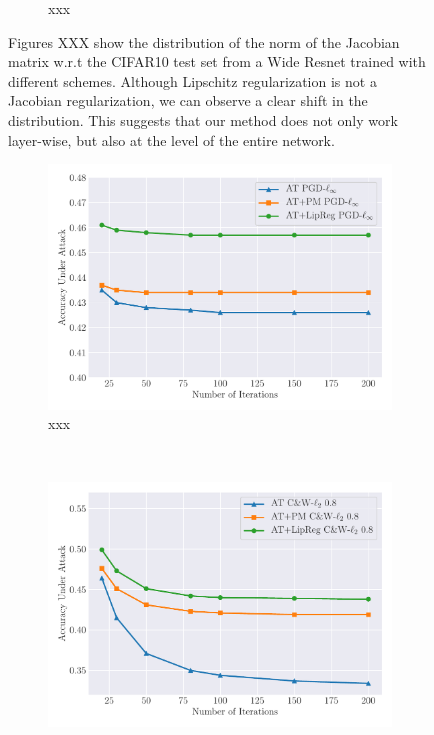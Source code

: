 \begin{figure}[h]
\begin{subfigure}[b]{\textwidth}
      \caption{xxx}
      \label{figure:ch5-jacobian_distribution_v2}
   \end{subfigure}
   \caption{Figures XXX show the distribution of the norm of the Jacobian matrix w.r.t the CIFAR10 test set from a Wide Resnet trained with different schemes. Although Lipschitz regularization is not a Jacobian regularization, we can observe a clear shift in the distribution. This suggests that our method does not only work layer-wise, but also at the level of the entire network.}
\end{figure}



\begin{figure}[h]
   \centering
   \begin{subfigure}[b]{\textwidth}
     \centering
     \includegraphics[width=\scalefigure\textwidth]{figures/main/ch5-lipschitz_regularization/attacks_iter_pgd.pdf}
     \caption{xxx}
     \label{figure:ch5-attacks_pgd}
   \end{subfigure}
   \\[2cm]
   \begin{subfigure}[b]{\textwidth}
      \centering
      \includegraphics[width=\scalefigure\textwidth]{figures/main/ch5-lipschitz_regularization/attacks_iter_cw.pdf}

\end{subfigure}
\end{figure}
